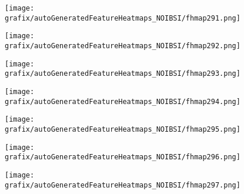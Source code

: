 \begin{subfigure}{\wid\textwidth} 
    \centering 
    \caption{\tiny \sffamily {}} 
    \vspace{\vsp} 
    \texttt{[image: grafix/autoGeneratedFeatureHeatmaps\_NOIBSI/fhmap291.png]} 
\end{subfigure} 
\hspace{\hsp} 
\begin{subfigure}{\wid\textwidth} 
    \centering 
    \caption{\tiny \sffamily {}} 
    \vspace{\vsp} 
    \texttt{[image: grafix/autoGeneratedFeatureHeatmaps\_NOIBSI/fhmap292.png]} 
\end{subfigure} 
\hspace{\hsp} 
\begin{subfigure}{\wid\textwidth} 
    \centering 
    \caption{\tiny \sffamily {}} 
    \vspace{\vsp} 
    \texttt{[image: grafix/autoGeneratedFeatureHeatmaps\_NOIBSI/fhmap293.png]} 
\end{subfigure} 
\hspace{\hsp} 
\begin{subfigure}{\wid\textwidth} 
    \centering 
    \caption{\tiny \sffamily {}} 
    \vspace{\vsp} 
    \texttt{[image: grafix/autoGeneratedFeatureHeatmaps\_NOIBSI/fhmap294.png]} 
\end{subfigure} 
\hspace{\hsp} 
\begin{subfigure}{\wid\textwidth} 
    \centering 
    \caption{\tiny \sffamily {}} 
    \vspace{\vsp} 
    \texttt{[image: grafix/autoGeneratedFeatureHeatmaps\_NOIBSI/fhmap295.png]} 
\end{subfigure} 
\hspace{\hsp} 
\begin{subfigure}{\wid\textwidth} 
    \centering 
    \caption{\tiny \sffamily {}} 
    \vspace{\vsp} 
    \texttt{[image: grafix/autoGeneratedFeatureHeatmaps\_NOIBSI/fhmap296.png]} 
\end{subfigure} 
\hspace{\hsp} 
\begin{subfigure}{\wid\textwidth} 
    \centering 
    \caption{\tiny \sffamily {}} 
    \vspace{\vsp} 
    \texttt{[image: grafix/autoGeneratedFeatureHeatmaps\_NOIBSI/fhmap297.png]} 
\end{subfigure} 
